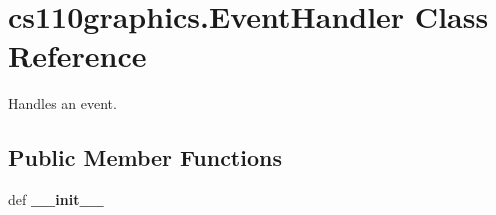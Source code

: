 \hypertarget{classcs110graphics_1_1EventHandler}{
\section{cs110graphics.EventHandler Class Reference}
\label{classcs110graphics_1_1EventHandler}
}


Handles an event.  
\subsection*{Public Member Functions}
\begin{DoxyCompactItemize}
\item 
\hypertarget{classcs110graphics_1_1EventHandler_ad7fc16dbc70aae1a86f541b0e806da98}{
def {\bfseries \_\-\_\-init\_\-\_\-}}
\label{classcs110graphics_1_1EventHandler_ad7fc16dbc70aae1a86f541b0e806da98}


\end{DoxyCompactItemize}
